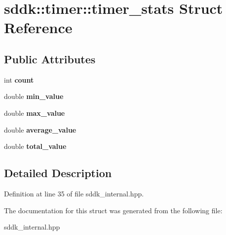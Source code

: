 \hypertarget{structsddk_1_1timer_1_1timer__stats}{}\section{sddk\+:\+:timer\+:\+:timer\+\_\+stats Struct Reference}
\label{structsddk_1_1timer_1_1timer__stats}
\subsection*{Public Attributes}
\begin{DoxyCompactItemize}
\item 
\hypertarget{structsddk_1_1timer_1_1timer__stats_a6c6221133fcedf8951d769693c457f0c}{}int {\bfseries count}\label{structsddk_1_1timer_1_1timer__stats_a6c6221133fcedf8951d769693c457f0c}

\item 
\hypertarget{structsddk_1_1timer_1_1timer__stats_a5a10d3ea937cd8ef70d31998fee22bfd}{}double {\bfseries min\+\_\+value}\label{structsddk_1_1timer_1_1timer__stats_a5a10d3ea937cd8ef70d31998fee22bfd}

\item 
\hypertarget{structsddk_1_1timer_1_1timer__stats_ac4c0df067cb227b7cd6b91944baf1731}{}double {\bfseries max\+\_\+value}\label{structsddk_1_1timer_1_1timer__stats_ac4c0df067cb227b7cd6b91944baf1731}

\item 
\hypertarget{structsddk_1_1timer_1_1timer__stats_a38f10d730347019d25f8da2306253693}{}double {\bfseries average\+\_\+value}\label{structsddk_1_1timer_1_1timer__stats_a38f10d730347019d25f8da2306253693}

\item 
\hypertarget{structsddk_1_1timer_1_1timer__stats_af3a4d86b4c9e4efcde72b01ae0c44036}{}double {\bfseries total\+\_\+value}\label{structsddk_1_1timer_1_1timer__stats_af3a4d86b4c9e4efcde72b01ae0c44036}

\end{DoxyCompactItemize}


\subsection{Detailed Description}


Definition at line 35 of file sddk\+\_\+internal.\+hpp.



The documentation for this struct was generated from the following file\+:\begin{DoxyCompactItemize}
\item 
sddk\+\_\+internal.\+hpp\end{DoxyCompactItemize}
